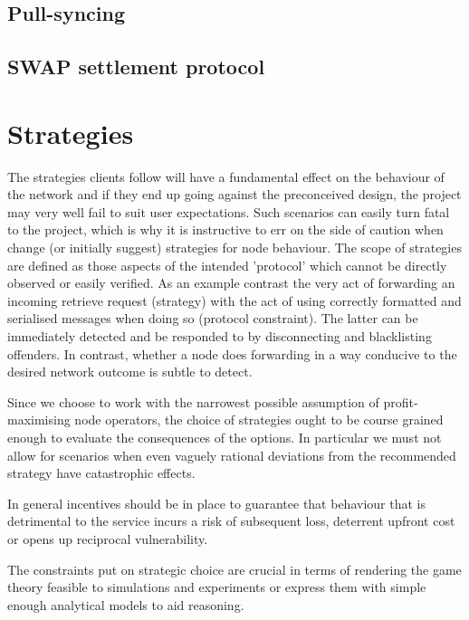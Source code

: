\section{Pull-syncing \statusorange}\label{spec:protocol:pull-sync}


\section{SWAP settlement protocol \statusorange}\label{spec:protocol:swap}


\chapter{Strategies \statusorange}\label{spec:strategy}


The strategies clients follow will have a fundamental effect on the behaviour of the network and if they end up going against the preconceived design, the project may very well fail to suit user expectations. Such scenarios can easily turn fatal to the project, which is why it is instructive to err on the side of caution when change (or initially suggest) strategies for node behaviour.
The scope of strategies are defined as those aspects of the intended 'protocol' which cannot be directly observed or easily verified. As an example contrast the very act of forwarding an incoming retrieve request (strategy) with the act of using correctly formatted and serialised messages when doing so (protocol constraint). The latter can be immediately detected and be responded to by disconnecting and blacklisting offenders. In contrast, whether a node does forwarding in a way conducive to the desired network outcome is subtle to detect. 

Since we choose to work with the narrowest possible assumption of profit-maximising node operators, the choice of strategies ought to be course grained enough to evaluate the consequences of the options. In particular we must not allow for scenarios when even vaguely rational deviations from the recommended strategy have catastrophic effects.

In general incentives should be in place to guarantee that behaviour that is detrimental to the service incurs a risk of subsequent loss, deterrent upfront cost or opens up reciprocal  vulnerability. 

The constraints put on strategic choice are crucial in terms of rendering the game theory feasible to simulations and experiments or express them with simple enough analytical models to aid reasoning. 


